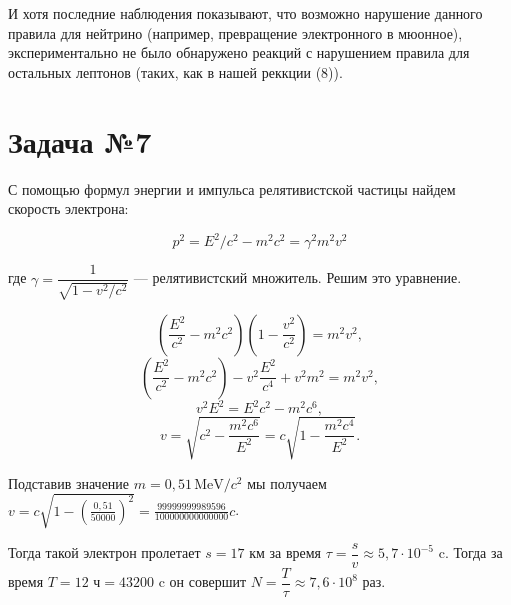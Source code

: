 \documentclass[12pt]{article}
\newcommand{\x}{\cdot}
\begin{document}
 И хотя последние наблюдения показывают, что возможно нарушение данного правила для нейтрино (например, превращение электронного в мюонное), экспериментально не было обнаружено реакций с нарушением правила для остальных лептонов (таких, как в нашей реккции (8)). 

\section{Задача №7}

С помощью формул энергии и импульса релятивистской частицы найдем скорость электрона: 

\begin{equation}
p^2 = E^2/c^2 - m^2c^2 = \gamma^2 m^2v^2 
\end{equation}

где $ \gamma = \dfrac{1}{\sqrt{1-v^2/c^2}} $ --- релятивистский множитель. Решим это уравнение. %

$$ \left( \dfrac{E^2}{c^2} - m^2c^2\right) \left(1 - \dfrac{v^2}{c^2}\right) = m^2v^2 ,$$
$$ \left( \dfrac{E^2}{c^2} - m^2c^2\right) - v^2\dfrac{E^2}{c^4} + v^2m^2   = m^2v^2,$$
$$  v^2 E^2 = E^2c^2 - m^2c^6   ,$$
\begin{equation}v = \sqrt{c^2 - \dfrac{m^2c^6}{E^2}} = c\sqrt{1 - \dfrac{m^2c^4}{E^2}} .
\end{equation}

Подставив значение $ m = 0,51 \, \text{MeV}/c^2 $ мы получаем  $ v = c\sqrt{1 - (\frac{0,51}{50000})^2} = \frac{99999999989596}{100000000000000}c$.

Тогда такой электрон пролетает $ s = 17 $ км за время $ \tau  = \dfrac{s}{v}  \approx 5,7 \x 10^{-5} $ c. Тогда за время $ T = 12 \text{ ч} = 43200 \text{ c} $ он совершит $ N = \dfrac{T}{\tau} \approx 7,6 \x 10^8 $ раз.

\begin{center}
	{\fbox{Ответ: $ N \approx 7,6 \x 10^8 $ раз}} \\
\end{center} 
\end{document}
